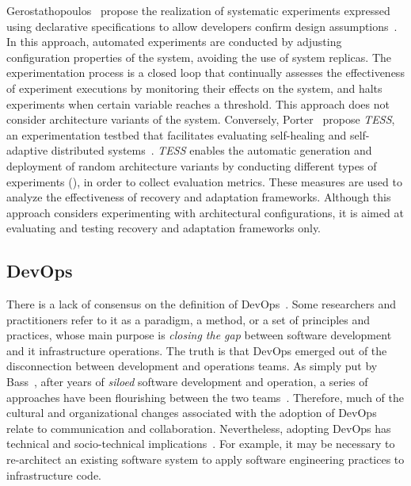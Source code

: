 Gerostathopoulos~\etal{} propose the realization of systematic experiments expressed using declarative specifications to allow developers confirm design assumptions~\cite{gerostathopoulos-2016-towards}. In this approach, automated experiments are conducted by adjusting configuration properties of the system, avoiding the use of system replicas. The experimentation process is a closed loop that continually assesses the effectiveness of experiment executions by monitoring their effects on the system, and halts experiments when certain variable reaches a threshold. This approach does not consider architecture variants of the system. Conversely, Porter~\etal{} propose \textit{TESS}, an experimentation testbed that facilitates evaluating self-healing and self-adaptive distributed systems~\cite{porter-2018-tess}. \textit{TESS} enables the automatic generation and deployment of random architecture variants by conducting different types of experiments (), in order to collect evaluation metrics. These measures are used to analyze the effectiveness of recovery and adaptation frameworks. Although this approach considers experimenting with architectural configurations, it is aimed at evaluating and testing recovery and adaptation frameworks only.


\subsection{DevOps}
\label{subsect:background--devops}


There is a lack of consensus on the definition of DevOps~\cite{jabbari-2016-what}. Some researchers and practitioners refer to it as a paradigm, a method, or a set of principles and practices, whose main purpose is \emph{closing the gap} between software development and \gls{it} infrastructure operations. The truth is that DevOps emerged out of the disconnection between development and operations teams. As simply put by Bass~\etal{}, after years of \emph{siloed} software development and operation, a series of approaches have been flourishing between the two teams~\cite{bass-2015-devops}. Therefore, much of the cultural and organizational changes associated with the adoption of DevOps relate to communication and collaboration. Nevertheless, adopting DevOps has technical and socio-technical implications~\cite{artac-2017-devops,bass-2015-devops}. For example, it may be necessary to re-architect an existing software system to apply software engineering practices to infrastructure code.

